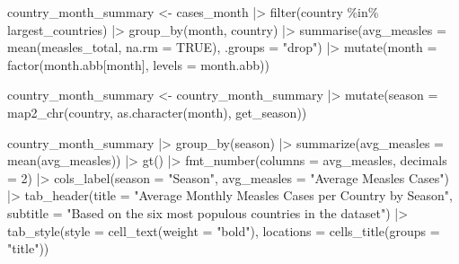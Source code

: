 \documentclass[
  letterpaper,
  DIV=11,
  numbers=noendperiod]{scrartcl}
\newenvironment{Shaded}{\begin{snugshade}}{\end{snugshade}}
\newcommand{\AttributeTok}[1]{\textcolor[rgb]{0.40,0.45,0.13}{#1}}
\newcommand{\ConstantTok}[1]{\textcolor[rgb]{0.56,0.35,0.01}{#1}}
\newcommand{\DecValTok}[1]{\textcolor[rgb]{0.68,0.00,0.00}{#1}}
\newcommand{\FunctionTok}[1]{\textcolor[rgb]{0.28,0.35,0.67}{#1}}
\newcommand{\NormalTok}[1]{\textcolor[rgb]{0.00,0.23,0.31}{#1}}
\newcommand{\OtherTok}[1]{\textcolor[rgb]{0.00,0.23,0.31}{#1}}
\newcommand{\SpecialCharTok}[1]{\textcolor[rgb]{0.37,0.37,0.37}{#1}}
\newcommand{\StringTok}[1]{\textcolor[rgb]{0.13,0.47,0.30}{#1}}
\begin{document}
\begin{Shaded}
\begin{Highlighting}[]
\NormalTok{country\_month\_summary }\OtherTok{\textless{}{-}}\NormalTok{ cases\_month }\SpecialCharTok{|\textgreater{}}
  \FunctionTok{filter}\NormalTok{(country }\SpecialCharTok{\%in\%}\NormalTok{ largest\_countries) }\SpecialCharTok{|\textgreater{}}
  \FunctionTok{group\_by}\NormalTok{(month, country) }\SpecialCharTok{|\textgreater{}}
  \FunctionTok{summarise}\NormalTok{(}\AttributeTok{avg\_measles =} \FunctionTok{mean}\NormalTok{(measles\_total, }\AttributeTok{na.rm =} \ConstantTok{TRUE}\NormalTok{), }\AttributeTok{.groups =} \StringTok{"drop"}\NormalTok{) }\SpecialCharTok{|\textgreater{}}
  \FunctionTok{mutate}\NormalTok{(}\AttributeTok{month =} \FunctionTok{factor}\NormalTok{(month.abb[month], }\AttributeTok{levels =}\NormalTok{ month.abb))}

\NormalTok{country\_month\_summary }\OtherTok{\textless{}{-}}\NormalTok{ country\_month\_summary }\SpecialCharTok{|\textgreater{}}
  \FunctionTok{mutate}\NormalTok{(}\AttributeTok{season =} \FunctionTok{map2\_chr}\NormalTok{(country, }\FunctionTok{as.character}\NormalTok{(month), get\_season))}

\NormalTok{country\_month\_summary }\SpecialCharTok{|\textgreater{}}
  \FunctionTok{group\_by}\NormalTok{(season) }\SpecialCharTok{|\textgreater{}}
  \FunctionTok{summarize}\NormalTok{(}\AttributeTok{avg\_measles =} \FunctionTok{mean}\NormalTok{(avg\_measles)) }\SpecialCharTok{|\textgreater{}}
  \FunctionTok{gt}\NormalTok{() }\SpecialCharTok{|\textgreater{}}
  \FunctionTok{fmt\_number}\NormalTok{(}\AttributeTok{columns =}\NormalTok{ avg\_measles, }\AttributeTok{decimals =} \DecValTok{2}\NormalTok{) }\SpecialCharTok{|\textgreater{}}
  \FunctionTok{cols\_label}\NormalTok{(}\AttributeTok{season =} \StringTok{"Season"}\NormalTok{,}
             \AttributeTok{avg\_measles =} \StringTok{"Average Measles Cases"}\NormalTok{) }\SpecialCharTok{|\textgreater{}}
  \FunctionTok{tab\_header}\NormalTok{(}\AttributeTok{title =} \StringTok{"Average Monthly Measles Cases per Country by Season"}\NormalTok{,}
             \AttributeTok{subtitle =} \StringTok{"Based on the six most populous countries in the dataset"}\NormalTok{) }\SpecialCharTok{|\textgreater{}}
  \FunctionTok{tab\_style}\NormalTok{(}\AttributeTok{style =} \FunctionTok{cell\_text}\NormalTok{(}\AttributeTok{weight =} \StringTok{"bold"}\NormalTok{),}
            \AttributeTok{locations =} \FunctionTok{cells\_title}\NormalTok{(}\AttributeTok{groups =} \StringTok{"title"}\NormalTok{))}
\end{Highlighting}
\end{Shaded}
\end{document}
